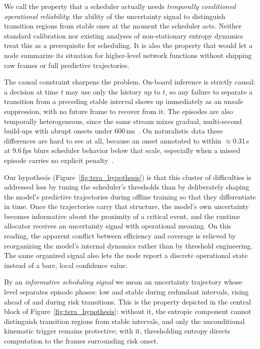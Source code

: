 \documentclass[a4paper,fleqn]{cas-dc}
\begin{document}
We call the property that a scheduler actually needs \emph{temporally conditioned
operational reliability}: the ability of the uncertainty signal to distinguish
transition regions from stable ones at the moment the scheduler acts. Neither
standard calibration nor existing analyses of non-stationary entropy
dynamics~\cite{braverman2020calib,dera2023trust} treat this as a prerequisite for
scheduling. It is also the property that would let a node summarize its situation
for higher-level network functions without shipping raw frames or full predictive
trajectories.

The causal constraint sharpens the problem. On-board inference is strictly causal:
a decision at time $t$ may use only the history up to $t$, so any failure to
separate a transition from a preceding stable interval shows up immediately as an
unsafe suppression, with no future frame to recover from it. The episodes are
also temporally heterogeneous, since the same stream mixes gradual, multi-second
build-ups with abrupt onsets under
$600$\,ms~\cite{dingus2016shrp2,bouhsissin2023driver}. On
naturalistic data these differences are hard to see at all, because an onset
annotated to
within $\approx$0.31\,s at 9.6\,fps blurs scheduler behavior below that scale,
especially when a missed episode carries no explicit
penalty~\cite{dingus2016shrp2,fang2022dada,ortega2020dmd}.

Our hypothesis (Figure~\ref{fig:tera_hypothesis}) is that this cluster of
difficulties is addressed less by tuning the scheduler's thresholds than by
deliberately shaping the model's predictive trajectories during offline training so
that they differentiate in time. Once the trajectories carry that structure, the model's own uncertainty becomes informative about the proximity of a critical event, and the runtime allocator receives an uncertainty signal with operational meaning. On this reading, the apparent conflict
between efficiency and coverage is relieved by reorganizing the model's internal
dynamics rather than by threshold engineering. The same organized signal also
lets the node report a discrete operational state instead of a bare, local
confidence value.

{\color{\revcolor}By an \emph{informative scheduling signal} we mean an uncertainty
trajectory whose level separates episode phases: low and stable during
redundant intervals, rising ahead of and during risk transitions. This is the
property depicted in the central block of Figure~\ref{fig:tera_hypothesis}:
without it, the entropic component cannot distinguish transition regions from
stable intervals, and only the unconditional kinematic trigger remains
protective; with it, thresholding entropy directs computation to the frames
surrounding risk onset.}
\end{document}
